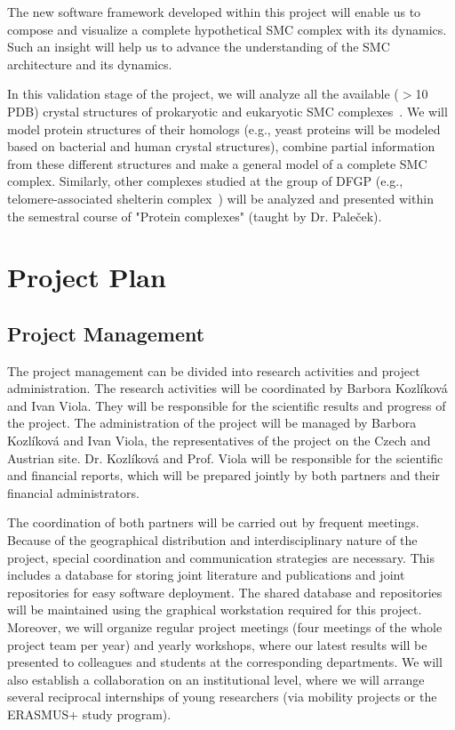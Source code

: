 \documentclass[11pt,a4paper,titlepage,oneside,onecolumn]{article}
\begin{document}
The new software framework developed within this project will enable us to compose and visualize a complete hypothetical SMC complex with its dynamics. 
Such an insight will help us to advance the understanding of the SMC architecture and its dynamics.
 
In this validation stage of the project, we will analyze all the available ($>$10 PDB) crystal structures of prokaryotic and eukaryotic SMC complexes~\cite{Palecek2015}. 
We will model protein structures of their homologs (e.g., yeast proteins will be modeled based on bacterial and human crystal structures), combine partial information from these different structures and make a general model of a complete SMC complex. 
Similarly, other complexes studied at the group of DFGP (e.g., telomere-associated shelterin complex~\cite{Janouskova2015,Schrumpfova}) will be analyzed and presented within the semestral course of "Protein complexes" (taught by Dr. Pale\v{c}ek).




\section{Project Plan}

\subsection{Project Management}
The project management can be divided into research activities and project administration.
The research activities will be coordinated by Barbora Kozl\'{i}kov\'{a} and Ivan Viola. 
They will be responsible for the scientific results and progress of the project.
The administration of the project will be managed by Barbora Kozl\'{i}kov\'{a} and Ivan Viola, the representatives of the project on the Czech and Austrian site. 
Dr. Kozl\'{i}kov\'{a} and Prof. Viola will be responsible for the scientific and financial reports, which will be prepared jointly by both partners and their financial administrators. 

The coordination of both partners will be carried out by frequent meetings. 
Because of the geographical distribution and interdisciplinary nature of the project, special coordination and communication strategies are necessary. 
This includes a database for storing joint literature and publications and joint repositories for easy software deployment. 
The shared database and repositories will be maintained using the graphical workstation required for this project. 
Moreover, we will organize regular project meetings (four meetings of the whole project team per year) and yearly workshops, where our latest results will be presented to colleagues and students at the corresponding departments. 
We will also establish a collaboration on an institutional level, where we will arrange several reciprocal internships of young researchers (via mobility projects or the ERASMUS+ study program). 
\end{document}
